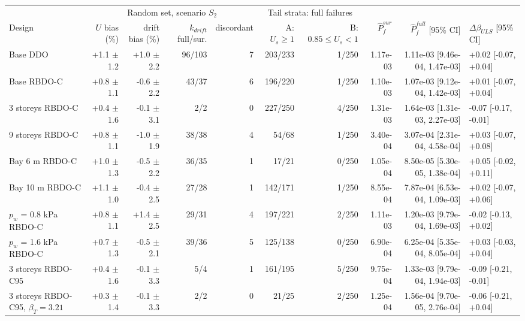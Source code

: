 \begin{tabular}{lrrrrrrrrl}
\toprule
 & \multicolumn{4}{c}{Random set, scenario $S_2$} & \multicolumn{2}{c}{Tail strata: full failures} & & & \\
\cmidrule(lr){2-5}\cmidrule(lr){6-7}
Design & $U$ bias (\%) & drift bias (\%) & $k_{drift}$ full/sur. & discordant & A: $U_s\geq1$ & B: $0.85\leq U_s<1$ & $\hat P_{f}^{sur}$ & $\hat P_{f}^{full}$ [95\% CI] & $\Delta\beta_{ULS}$ [95\% CI] \\
\midrule
Base DDO & +1.1 $\pm$ 1.2 & +1.0 $\pm$ 2.2 & 96/103 & 7 & 203/233 & 1/250 & 1.17e-03 & 1.11e-03 [9.46e-04, 1.47e-03] & +0.02 [-0.07, +0.04] \\
Base RBDO-C & +0.8 $\pm$ 1.1 & -0.6 $\pm$ 2.2 & 43/37 & 6 & 196/220 & 1/250 & 1.10e-03 & 1.07e-03 [9.12e-04, 1.42e-03] & +0.01 [-0.07, +0.04] \\
3 storeys RBDO-C & +0.4 $\pm$ 1.6 & -0.1 $\pm$ 3.1 & 2/2 & 0 & 227/250 & 4/250 & 1.31e-03 & 1.64e-03 [1.31e-03, 2.27e-03] & -0.07 [-0.17, -0.01] \\
9 storeys RBDO-C & +0.8 $\pm$ 1.1 & -1.0 $\pm$ 1.9 & 38/38 & 4 & 54/68 & 1/250 & 3.40e-04 & 3.07e-04 [2.31e-04, 4.58e-04] & +0.03 [-0.07, +0.08] \\
Bay 6 m RBDO-C & +1.0 $\pm$ 1.3 & -0.5 $\pm$ 2.2 & 36/35 & 1 & 17/21 & 0/250 & 1.05e-04 & 8.50e-05 [5.30e-05, 1.38e-04] & +0.05 [-0.02, +0.11] \\
Bay 10 m RBDO-C & +1.1 $\pm$ 1.0 & -0.4 $\pm$ 2.5 & 27/28 & 1 & 142/171 & 1/250 & 8.55e-04 & 7.87e-04 [6.53e-04, 1.09e-03] & +0.02 [-0.07, +0.06] \\
$p_w$ = 0.8 kPa RBDO-C & +0.8 $\pm$ 1.1 & +1.4 $\pm$ 2.5 & 29/31 & 4 & 197/221 & 2/250 & 1.11e-03 & 1.20e-03 [9.79e-04, 1.69e-03] & -0.02 [-0.13, +0.02] \\
$p_w$ = 1.6 kPa RBDO-C & +0.7 $\pm$ 1.3 & -0.5 $\pm$ 2.1 & 39/36 & 5 & 125/138 & 0/250 & 6.90e-04 & 6.25e-04 [5.35e-04, 8.05e-04] & +0.03 [-0.03, +0.04] \\
3 storeys RBDO-C95 & +0.4 $\pm$ 1.6 & -0.1 $\pm$ 3.3 & 5/4 & 1 & 161/195 & 5/250 & 9.75e-04 & 1.33e-03 [9.79e-04, 1.94e-03] & -0.09 [-0.21, -0.01] \\
3 storeys RBDO-C95, $\beta_T=3.21$ & +0.3 $\pm$ 1.4 & -0.1 $\pm$ 3.3 & 2/2 & 0 & 21/25 & 2/250 & 1.25e-04 & 1.56e-04 [9.70e-05, 2.76e-04] & -0.06 [-0.21, +0.04] \\
\bottomrule
\end{tabular}